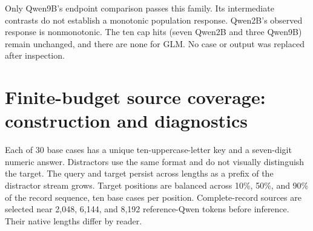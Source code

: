 \begin{table}[ht]\centering\small
\caption{All nine secondary paired scale contrasts. Differences and intervals are percentage points. Holm correction covers the entire nine-comparison secondary family.}

\end{table}

Only Qwen9B's endpoint comparison passes this family. Its intermediate contrasts do not establish a monotonic population response. Qwen2B's observed response is nonmonotonic. The ten cap hits (seven Qwen2B and three Qwen9B) remain unchanged, and there are none for GLM. No case or output was replaced after inspection.

\section{Finite-budget source coverage: construction and diagnostics}
\label{app:budget}

\begin{table}[ht]
\centering\small
\caption{\textbf{Fixed-budget retrieval under hash retention.} Entries are retained text / full-source optical correct out of 30 at the same total-input upper bound. Interaction is the LONG optical-minus-text difference minus its SHORT value. Adjusted $p$ is from the prespecified three-reader primary family.}
\label{tab:budget}
\end{table}
Each of 30 base cases has a unique ten-uppercase-letter key and a seven-digit numeric answer. Distractors use the same format and do not visually distinguish the target. The query and target persist across lengths as a prefix of the distractor stream grows. Target positions are balanced across 10\%, 50\%, and 90\% of the record sequence, ten base cases per position. Complete-record sources are selected near 2,048, 6,144, and 8,192 reference-Qwen tokens before inference. Their native lengths differ by reader.


